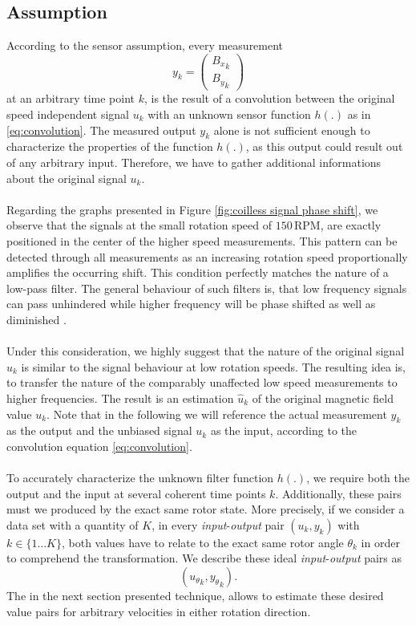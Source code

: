 \documentclass[english]{isasthesis}
\begin{document}
    		\subsection{Assumption}
    	According to the sensor assumption, every measurement 
    	\begin{equation}
 			y_k = \begin{pmatrix}{B_x}_k\\{B_y}_k\end{pmatrix}
		\end{equation} 			
 			 at an arbitrary time point $k$, is the result of a convolution between the original speed independent signal $u_k$ with an unknown sensor function $h(.)$ as in \eqref{eq:convolution}. The measured output $y_k$ alone is not sufficient enough to characterize the properties of the function $h(.)$, as this output could result out of any arbitrary input. Therefore, we have to gather additional informations about the original signal $u_k$. \\\\
 			 Regarding the graphs presented in Figure \ref{fig:coilless signal phase shift}, we observe that the signals at the small rotation speed of $150\,$RPM, are exactly positioned in the center of the higher speed measurements. This pattern can be detected through all measurements as an increasing rotation speed proportionally amplifies the occurring shift. This condition perfectly matches the nature of a low-pass filter. The general behaviour of such filters is, that low frequency signals can pass unhindered while higher frequency will be phase shifted as well as diminished \cite{tietze2013halbleiter}. \\ \\
    		Under this consideration, we highly suggest that the nature of the original signal $u_k$ is similar to the signal behaviour at low rotation speeds. The resulting idea is, to transfer the nature of the comparably unaffected low speed measurements to higher frequencies.  The result is an estimation $\hat{u}_k$ of the original magnetic field value $u_k$. Note that in the following we will reference the actual measurement $y_k$ as the output and the unbiased signal $u_k$ as the input, according to the convolution equation \ref{eq:convolution}. \\ \\
    		To accurately characterize the unknown filter function $h(.)$, we require both the output and the input at several coherent time points $k$. Additionally, these pairs must we produced by the exact same rotor state. More precisely, if we consider a data set with a quantity of $K$, in every \textit{input}-\textit{output} pair $(u_k,y_k)$ with $k\in\{1\dots K\}$, both values have to relate to the exact same rotor angle $\theta_k$ in order to comprehend the transformation. We describe these ideal \textit{input}-\textit{output} pairs as
    		\begin{equation}\label{eq:input-output pair}
    		({u_\theta}_k,{y_\theta}_k).
    		\end{equation}
    		The in the next section presented technique, allows to estimate these desired value pairs for arbitrary velocities in either rotation direction.
\end{document}
